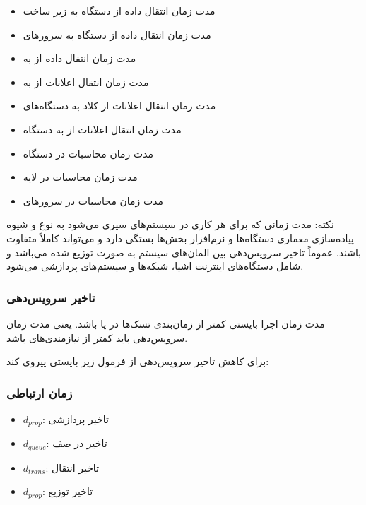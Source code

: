 \begin{itemize}
    \item مدت زمان انتقال داده از دستگاه  به زیر ساخت  
    \item مدت زمان انتقال داده از دستگاه  به سرور‌های  
    \item مدت زمان انتقال داده از  به  
    \item مدت زمان انتقال اعلانات از  به  
    \item مدت زمان انتقال اعلانات از کلاد به دستگاه‌های 
    \item مدت زمان انتقال اعلانات از  به دستگاه 
    \item مدت زمان محاسبات در دستگاه  
    \item مدت زمان محاسبات در لایه  
    \item مدت زمان محاسبات در سرور‌های 
\end{itemize}

نکته: مدت زمانی که برای هر کاری در سیستم‌های  سپری می‌شود به نوع و شیوه
پیاده‌سازی معماری دستگاه‌ها و نرم‌افزار بخش‌ها بستگی دارد و می‌تواند کاملاً
متفاوت باشند. عموماً تاخیر سرویس‌دهی بین المان‌های سیستم به صورت  توزیع
شده می‌باشد و شامل دستگاه‌های اینترنت اشیا، شبکه‌ها و سیستم‌های پردازشی می‌شود.

\subsubsection*{تاخیر سرویس‌دهی}


مدت زمان اجرا بایستی کمتر از زمان‌بندی تسک‌ها در  یا  باشد.
یعنی مدت زمان سرویس‌دهی باید کمتر از نیازمندی‌های 
باشد.

برای کاهش تاخیر سرویس‌دهی از فرمول زیر بایستی پیروی کند:


\subsubsection{زمان ارتباطی}


\begin{itemize}
    \item $d_{prop}$: تاخیر پردازشی
    \item $d_{queue}$: تاخیر در صف
    \item $d_{trans}$: تاخیر انتقال
    \item $d_{prop}$: تاخیر توزیع
\end{itemize}


